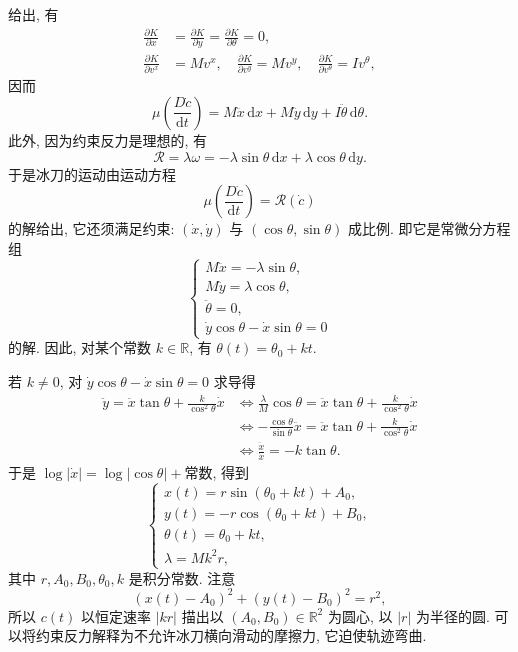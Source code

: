 \begin{description}[font=\normalfont,leftmargin=2em,labelwidth=1.5em]
\begin{enumerate}[label=(\alph*),ref=\alph*,leftmargin=*]
\[\]
给出, 有
\begin{align*}
  \frac{\partial K}{\partial x}&=\frac{\partial K}{\partial y}=\frac{\partial K}{\partial\theta}=0,\\
  \frac{\partial K}{\partial v^x}&=Mv^x,\quad
  \frac{\partial K}{\partial v^y}=Mv^y,\quad
  \frac{\partial K}{\partial v^\theta}=Iv^\theta,
\end{align*}
因而
\[
  \mu\left(\frac{D\dot c}{\mathrm{d}t}\right)
  =M\ddot{x}\,\mathrm{d}x+M\ddot y\,\mathrm{d}y+I\ddot\theta\,\mathrm{d}\theta.
\]
此外, 因为约束反力是理想的, 有
\[
  \mathcal R=\lambda\omega=-\lambda\sin\theta\,\mathrm{d}x+\lambda\cos\theta\,\mathrm{d}y.
\]
于是冰刀的运动由运动方程
\[
  \mu\left(\frac{D\dot c}{\mathrm{d}t}\right)=\mathcal R(\dot c)
\]
的解给出, 它还须满足约束: $(\dot x,\dot y)$ 与 $(\cos\theta,\sin\theta)$ 成比例. 即它是常微分方程组
\[
  \begin{cases}
   M\ddot{x}=-\lambda\sin\theta,\\
   M\ddot y=\lambda\cos\theta,\\
   \ddot\theta=0,\\
   \dot y\cos\theta-\dot x\sin\theta=0
  \end{cases}
\]
的解. 因此, 对某个常数 $k\in\mathbb{R}$, 有 $\theta(t)=\theta_0+kt$.

若 $k\ne0$, 对 $\dot y\cos\theta-\dot x\sin\theta=0$ 求导得
\begin{align*}
  \ddot y=\ddot{x}\tan\theta+\frac{k}{\cos^2\theta}\dot x
  &\iff\frac{\lambda}{M}\cos\theta=\ddot{x}\tan\theta+\frac{k}{\cos^2\theta}\dot x\\
  &\iff-\frac{\cos\theta}{\sin\theta}\ddot{x}=\ddot{x}\tan\theta+\frac{k}{\cos^2\theta}\dot x\\
  &\iff\frac{\ddot{x}}{\dot x}=-k\tan\theta.
\end{align*}
于是 $\log|\dot x|=\log|\cos\theta|+\text{常数}$, 得到
\[
  \begin{cases}
   x(t)=r\sin(\theta_0+kt)+A_0,\\
   y(t)=-r\cos(\theta_0+kt)+B_0,\\
   \theta(t)=\theta_0+kt,\\
   \lambda=Mk^2r,
  \end{cases}
\]
其中 $r,A_0,B_0,\theta_0,k$ 是积分常数. 注意
\[
  (x(t)-A_0)^2+(y(t)-B_0)^2=r^2,
\]
所以 $c(t)$ 以恒定速率 $|kr|$ 描出以 $(A_0,B_0)\in\mathbb{R}^2$ 为圆心, 以 $|r|$ 为半径的圆. 可以将约束反力解释为不允许冰刀横向滑动的摩擦力, 它迫使轨迹弯曲.


\end{enumerate}
\end{description}
